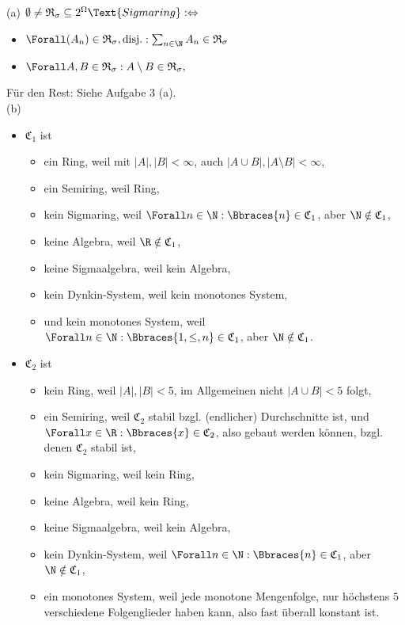 \begin{solution}

(a) $\emptyset \neq \mathfrak{R}_\sigma \subseteq 2^\Omega \Text{Sigmaring} : \Leftrightarrow$
\begin{itemize}
  \item $\Forall (A_n) \in \mathfrak{R}_\sigma, \text{disj.}: \sum_{n \in \N} A_n \in \mathfrak{R}_\sigma$
  \item $\Forall A, B \in \mathfrak{R}_\sigma: A \setminus B \in \mathfrak{R}_\sigma,$
\end{itemize}

Für den Rest: Siehe Aufgabe 3 (a). \\

(b)

\begin{itemize}

  \item $\mathfrak{C}_1$ ist
  \begin{itemize}
    \item ein Ring, weil mit $|A|, |B| < \infty$, auch $|A \cup B|, |A \setminus B| < \infty$,
    \item ein Semiring, weil Ring,
    \item kein Sigmaring, weil $\Forall n \in \N: \Bbraces{n} \in \mathfrak{C}_1$, aber $\N \notin \mathfrak{C}_1$,
    \item keine Algebra, weil $\R \notin \mathfrak{C}_1$,
    \item keine Sigmaalgebra,  weil kein Algebra,
    \item kein Dynkin-System,  weil kein monotones System,
    \item und kein monotones System, weil $\Forall n \in \N: \Bbraces{1, \leq, n} \in \mathfrak{C}_1$, aber $\N \notin \mathfrak{C}_1$.
  \end{itemize}

  \item$\mathfrak{C}_2$ ist
  \begin{itemize}
    \item kein Ring, weil $|A|, |B| < 5$, im Allgemeinen nicht $|A \cup B| < 5$ folgt,
    \item ein Semiring, weil $\mathfrak{C}_2$ stabil bzgl. (endlicher) Durchschnitte ist, und $\Forall x \in \R: \Bbraces{x} \in \mathfrak{C}_2$, also  gebaut werden können, bzgl. denen $\mathfrak{C}_2$ stabil ist,
    \item kein Sigmaring,  weil kein Ring,
    \item keine Algebra,  weil kein Ring,
    \item keine Sigmaalgebra, weil kein Algebra,
    \item kein Dynkin-System, weil $\Forall n \in \N: \Bbraces{n} \in \mathfrak{C}_1$, aber $\N \notin \mathfrak{C}_1$,
    \item ein monotones System, weil jede monotone Mengenfolge, nur höchstens $5$ verschiedene Folgenglieder haben kann, also fast überall konstant ist.
  \end{itemize}

\end{itemize}

\end{solution}

